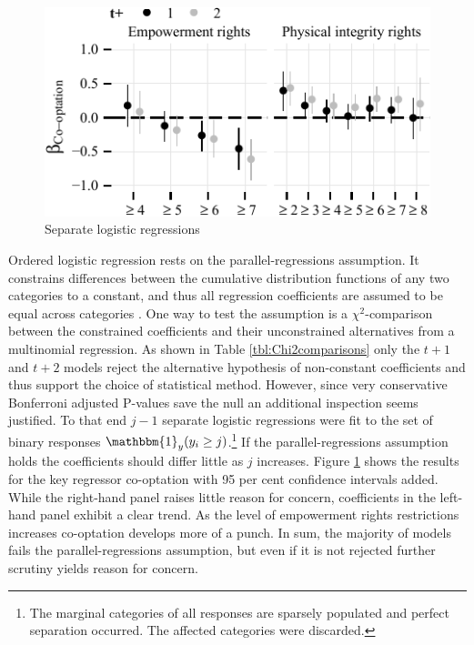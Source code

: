 \begin{figure}
\centering
\includegraphics[width=\linewidth]{./sections/03replication/parallelRegressionsCoefPlot_manualLabels.pdf}
\caption{Separate logistic regressions}
\label{fig:separateLogisticCoef}
\end{figure}
Ordered logistic regression rests on the 
parallel-regressions assumption. It constrains differences 
between the cumulative distribution functions of any two 
categories to a constant, and thus all regression 
coefficients are assumed to be equal across categories 
\citep[476]{Fox.2008}. One way to test the assumption is a 
$\chi^2$-comparison between the constrained coefficients and 
their unconstrained alternatives from a multinomial 
regression. As shown in Table \ref{tbl:Chi2comparisons} only
the $t+1$ and $t+2$ models reject the alternative hypothesis 
of non-constant coefficients and thus support the choice of
statistical method. However, since very conservative 
Bonferroni adjusted P-values save the null an additional
inspection seems justified. To that end $j-1$ separate 
logistic regressions were fit to the set of binary responses 
$\mathbbm{1}_y(y_{i} \ge j)$.\footnote{The marginal 
categories of all responses are sparsely populated
and perfect separation occurred. The affected categories were 
discarded.} If the parallel-regressions assumption holds 
the coefficients should differ little as $j$ increases. 
Figure \ref{fig:separateLogisticCoef} shows the results for 
the key regressor co-optation with 95 per cent confidence 
intervals added. While the right-hand panel raises little 
reason for concern, coefficients in the left-hand panel 
exhibit a clear trend. As the level of empowerment rights 
restrictions increases co-optation develops more of a punch.
In sum, the majority of models fails the 
parallel-regressions assumption, but even if it is not 
rejected further scrutiny yields reason for concern.

